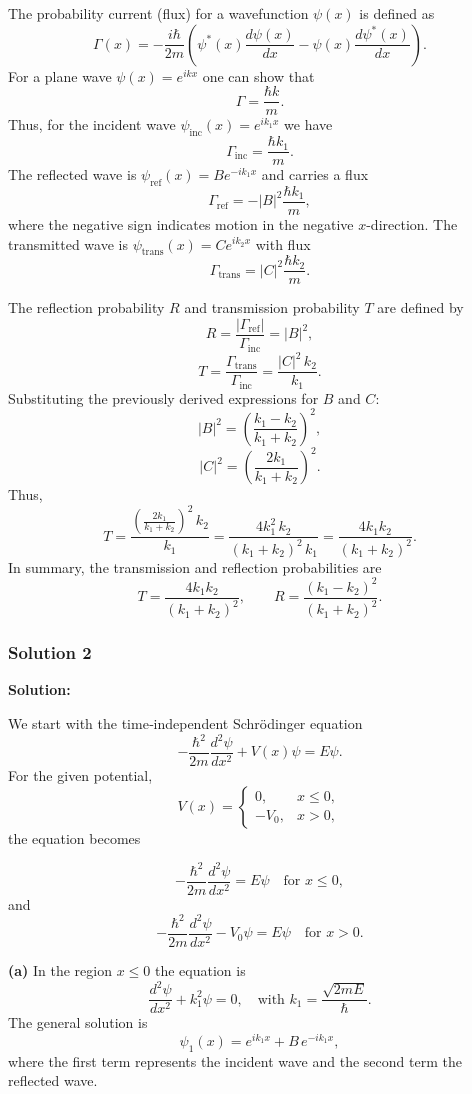 \documentclass{article}
\begin{document}
The probability current (flux) for a wavefunction \(\psi(x)\) is defined as
\[
\Gamma(x)=-\frac{i\hbar}{2m}\left(\psi^*(x)\frac{d\psi(x)}{dx}-\psi(x)\frac{d\psi^*(x)}{dx}\right).
\]
For a plane wave \(\psi(x)=e^{ikx}\) one can show that
\[
\Gamma=\frac{\hbar k}{m}.
\]
Thus, for the incident wave \(\psi_{\mathrm{inc}}(x)=e^{ik_1x}\) we have
\[
\Gamma_{\mathrm{inc}}=\frac{\hbar k_1}{m}.
\]
The reflected wave is \(\psi_{\mathrm{ref}}(x)=Be^{-ik_1x}\) and carries a flux
\[
\Gamma_{\mathrm{ref}}=-|B|^2\frac{\hbar k_1}{m},
\]
where the negative sign indicates motion in the negative \(x\)-direction. The transmitted wave is \(\psi_{\mathrm{trans}}(x)=Ce^{ik_2x}\) with flux
\[
\Gamma_{\mathrm{trans}}=|C|^2\frac{\hbar k_2}{m}.
\]

The reflection probability \( R \) and transmission probability \( T \) are defined by
\[
R=\frac{|\Gamma_{\mathrm{ref}}|}{\Gamma_{\mathrm{inc}}}=|B|^2,
\]
\[
T=\frac{\Gamma_{\mathrm{trans}}}{\Gamma_{\mathrm{inc}}}=\frac{|C|^2\,k_2}{k_1}.
\]
Substituting the previously derived expressions for \( B \) and \( C \):
\[
|B|^2=\left(\frac{k_1-k_2}{k_1+k_2}\right)^2,
\]
\[
|C|^2=\left(\frac{2k_1}{k_1+k_2}\right)^2.
\]
Thus,
\[
T=\frac{\left(\frac{2k_1}{k_1+k_2}\right)^2\,k_2}{k_1}=\frac{4k_1^2\,k_2}{(k_1+k_2)^2\,k_1}=\frac{4k_1k_2}{(k_1+k_2)^2}.
\]
In summary, the transmission and reflection probabilities are
\[
T=\frac{4k_1k_2}{(k_1+k_2)^2},\qquad R=\frac{(k_1-k_2)^2}{(k_1+k_2)^2}.
\]


\subsubsection{Solution 2}
\textbf{Solution:}

We start with the time‐independent Schrödinger equation
\[
-\frac{\hbar^2}{2m}\frac{d^2\psi}{dx^2} + V(x)\psi = E\psi.
\]
For the given potential,
\[
V(x) = \begin{cases} 
0, & x\le0, \\
-V_0, & x>0,
\end{cases}
\]
the equation becomes

\[
-\frac{\hbar^2}{2m}\frac{d^2\psi}{dx^2} = E\psi \quad \text{for } x\le0,
\]
and
\[
-\frac{\hbar^2}{2m}\frac{d^2\psi}{dx^2} - V_0\psi = E\psi \quad \text{for } x>0.
\]

\textbf{(a)} \quad In the region \(x\le0\) the equation is
\[
\frac{d^2\psi}{dx^2} + k_1^2 \psi = 0, \quad \text{with } k_1 = \frac{\sqrt{2mE}}{\hbar}.
\]
The general solution is
\[
\psi_1(x) = e^{ik_1x} + B\,e^{-ik_1x},
\]
where the first term represents the incident wave and the second term the reflected wave.
\end{document}
